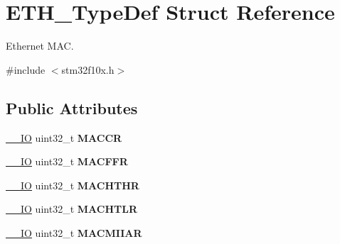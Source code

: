 \hypertarget{struct_e_t_h___type_def}{\section{E\-T\-H\-\_\-\-Type\-Def Struct Reference}
\label{struct_e_t_h___type_def}
}


Ethernet M\-A\-C.  




{\ttfamily \#include $<$stm32f10x.\-h$>$}

\subsection*{Public Attributes}
\begin{DoxyCompactItemize}
\item 
\hypertarget{struct_e_t_h___type_def_a68d7e7c68b5b8adcf7b2b96bc1eea7d9}{\hyperlink{group___c_m_s_i_s__core__definitions_gaec43007d9998a0a0e01faede4133d6be}{\-\_\-\-\_\-\-I\-O} uint32\-\_\-t {\bfseries M\-A\-C\-C\-R}}\label{struct_e_t_h___type_def_a68d7e7c68b5b8adcf7b2b96bc1eea7d9}

\item 
\hypertarget{struct_e_t_h___type_def_afdf573860dd5dcd13f2b6b19dcb92cc1}{\hyperlink{group___c_m_s_i_s__core__definitions_gaec43007d9998a0a0e01faede4133d6be}{\-\_\-\-\_\-\-I\-O} uint32\-\_\-t {\bfseries M\-A\-C\-F\-F\-R}}\label{struct_e_t_h___type_def_afdf573860dd5dcd13f2b6b19dcb92cc1}

\item 
\hypertarget{struct_e_t_h___type_def_ace541cc94118ec2db7c930a44960aa18}{\hyperlink{group___c_m_s_i_s__core__definitions_gaec43007d9998a0a0e01faede4133d6be}{\-\_\-\-\_\-\-I\-O} uint32\-\_\-t {\bfseries M\-A\-C\-H\-T\-H\-R}}\label{struct_e_t_h___type_def_ace541cc94118ec2db7c930a44960aa18}

\item 
\hypertarget{struct_e_t_h___type_def_a22bd30c653a4c1c8f46a59e0a821dcf8}{\hyperlink{group___c_m_s_i_s__core__definitions_gaec43007d9998a0a0e01faede4133d6be}{\-\_\-\-\_\-\-I\-O} uint32\-\_\-t {\bfseries M\-A\-C\-H\-T\-L\-R}}\label{struct_e_t_h___type_def_a22bd30c653a4c1c8f46a59e0a821dcf8}

\item 
\hypertarget{struct_e_t_h___type_def_af697fcc940139f7dcb483766420852be}{\hyperlink{group___c_m_s_i_s__core__definitions_gaec43007d9998a0a0e01faede4133d6be}{\-\_\-\-\_\-\-I\-O} uint32\-\_\-t {\bfseries M\-A\-C\-M\-I\-I\-A\-R}}\label{struct_e_t_h___type_def_af697fcc940139f7dcb483766420852be}


\end{DoxyCompactItemize}
